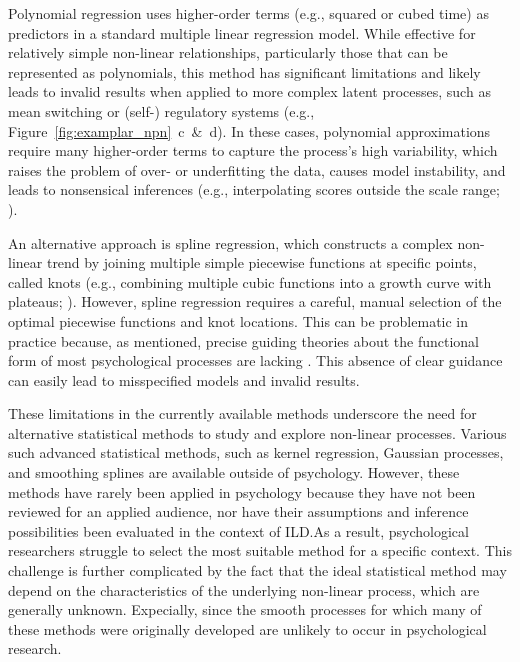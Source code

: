 \documentclass[man, floatsintext]{apa7}
\begin{document}
Polynomial regression \parencite{jebb_time_2015} uses higher-order terms
(e.g., squared or cubed time) as predictors in a standard multiple linear
regression model. While effective for relatively simple non-linear
relationships,
particularly those that can be represented as polynomials, this method has
significant limitations and likely leads to invalid results when applied to
more complex latent processes, such as mean switching or (self-) regulatory
systems (e.g., Figure~\ref{fig:examplar_npn}~c~\&~d). In these cases,
polynomial approximations require many higher-order
terms to capture the process's high variability, which raises the problem of
over- or underfitting the data, causes model instability, and leads to
nonsensical inferences (e.g., interpolating scores outside the scale range;
\textcite{boyd_divergence_2009,harrell_general_2001}).

An alternative approach is spline regression, which constructs a complex
non-linear trend by joining multiple simple piecewise functions at specific
points, called knots (e.g., combining multiple cubic functions into a growth
curve with plateaus; \textcite{tsay_nonlinear_2019}). However, spline
regression requires a careful, manual selection of the optimal piecewise
functions and
knot locations. This can be problematic in practice because, as mentioned,
precise guiding theories about the functional form of most psychological
processes are lacking \parencite{tan_time-varying_2011}. This absence of clear
guidance can easily lead to misspecified models and invalid results.

These limitations in the currently available methods underscore the need for
alternative statistical methods to study and explore non-linear processes.
Various such advanced statistical
methods, such as kernel regression, Gaussian processes, and smoothing splines
are available outside of psychology. However, these
methods have rarely been applied in psychology because they have not been
reviewed for an applied audience, nor have their assumptions and inference
possibilities been evaluated in the context of ILD.\@ As a result,
psychological researchers struggle to select the most suitable method for a
specific context. This challenge is further complicated by the fact that the
ideal statistical method may depend on the characteristics of the underlying
non-linear process, which are generally unknown. Expecially, since the smooth
processes for which many of these methods were originally developed are
unlikely to occur in psychological research.
\end{document}
